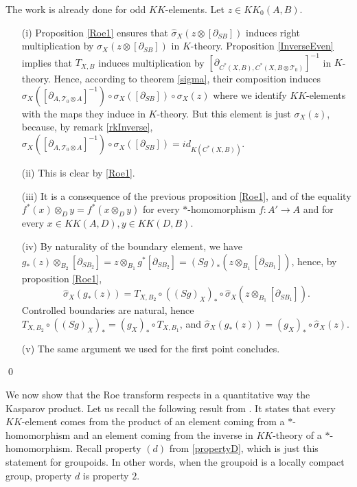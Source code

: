 \begin{dem} The work is already done for odd $KK$-elements. Let $z\in KK_0(A,B)$.
\begin{enumerate}
\item[(i)] Proposition \ref{Roe1} ensures that $\hat \sigma_X(z\otimes [\partial_{SB}])$ induces right multiplication by $\sigma_X(z\otimes [\partial_{SB}])$ in $K$-theory. Proposition \ref{InverseEven} implies that $T_{X,B}$ induces multiplication by $[\partial_{C^*(X,B),C^*(X,B\otimes\mathcal T_0)}]^{-1}$ in $K$-theory. Hence, according to theorem \ref{sigma}, their composition induces $ \sigma_X([\partial_{A,\mathcal T_0 \otimes  A}]^{-1})\circ\sigma_X([\partial_{SB}])\circ\sigma_X(z)$ where we identify $KK$-elements with the maps they induce in $K$-theory. But this element is just $\sigma_X(z)$, because, by remark \ref{rkInverse}, $\sigma_X([\partial_{A,\mathcal T_0 \otimes  A}]^{-1})\circ\sigma_X([\partial_{SB}])= id_{K(C^*(X,B))}$.
\item[(ii)] This is clear by \ref{Roe1}.
\item[(iii)] It is a consequence of the previous proposition \ref{Roe1}, and of the equality $f^*(x)\otimes_D y = f^*(x\otimes_D y)$ for every $*$-homomorphism $f : A'\rightarrow A$ and for every $x\in KK(A,D),y\in KK(D,B)$.
\item[(iv)] By naturality of the boundary element, we have $g_*(z)\otimes_{B_2} [\partial_{SB_2}] = z\otimes_{B_1} g^{*}[\partial _{SB_2}] = (Sg)_{*}(z\otimes_{B_1} [\partial _{SB_1}])$, hence, by proposition \ref{Roe1}, 
\[\hat\sigma_X(g_*(z)) = T_{X,B_2}\circ ((Sg)_X)_* \circ \hat\sigma_{X}(z\otimes_{B_1} [\partial_{SB_1}]).\]
Controlled boundaries are natural, hence $T_{X,B_2}\circ ((Sg)_X)_* = (g_X)_* \circ T_{X,B_1}$, and $\hat\sigma_X(g_*(z)) =(g_X)_* \circ \hat\sigma_X(z)$.
\item[(v)] The same argument we used for the first point concludes.
\end{enumerate}
\qed
\end{dem}

We now show that the Roe transform respects in a quantitative way the Kasparov product. Let us recall the following result from \cite{lafforgue2002k}. It states that every $KK$-element comes from the product of an element coming from a $*$-homomorphism and an element coming from the inverse in $KK$-theory of a $*$-homomorphism. Recall property $(d)$ from \ref{propertyD}, which is just this statement for groupoids. In other words, when the groupoid is a locally compact group, property $d$ is property $2$.

